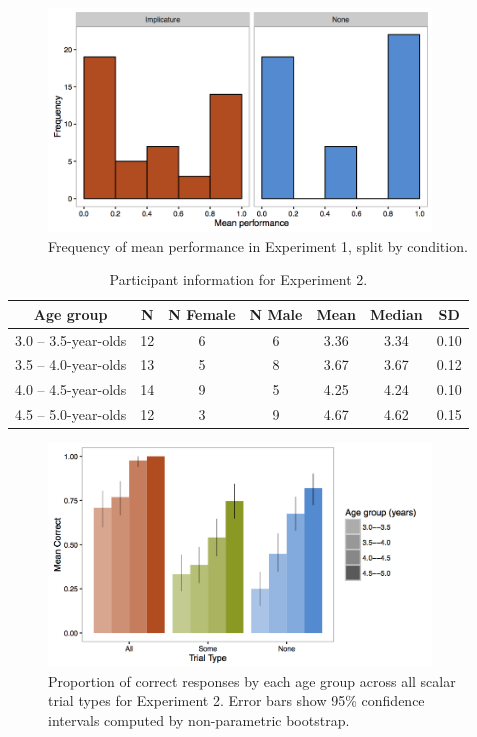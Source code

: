 \documentclass[man]{apa2}
\begin{document}
\begin{figure}
 \begin{center}
  \includegraphics[width=4in]{figures/exp1_hist.png}
  \caption{\label{fig:imp_hist} Frequency of mean performance in Experiment 1, split by condition.}
 \end{center}
\end{figure}

\begin{table}
\centering
\begin{tabular}{ccccccc}
\hline
{\bf Age group} & {\bf N} & {\bf N Female} & {\bf N Male} & {\bf Mean} & {\bf Median} & {\bf SD} \\
\hline
3.0 -- 3.5-year-olds & 12 & 6 & 6 & 3.36 & 3.34 & 0.10\\
3.5 -- 4.0-year-olds & 13 & 5 & 8 & 3.67 & 3.67 & 0.12\\
4.0 -- 4.5-year-olds & 14 & 9 & 5 & 4.25 & 4.24 & 0.10\\
4.5 -- 5.0-year-olds & 12 & 3 & 9 & 4.67 & 4.62 & 0.15\\
\hline
\end{tabular}
\caption{\label{tab:exp_2_demo}Participant information for Experiment 2.}
\end{table}

\begin{figure}
 \begin{center}
  \includegraphics[width=4in]{figures/exp2_performance.png}
  \caption{\label{fig:exp2_perf} Proportion of correct responses by each age group across all scalar trial types for Experiment 2. Error bars show 95\% confidence intervals computed by non-parametric bootstrap.}
 \end{center}
\end{figure}
\end{document}

